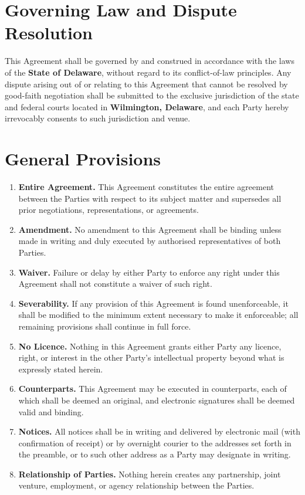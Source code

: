 \documentclass[11pt, a4paper]{article}
\begin{document}
\section{Governing Law and Dispute Resolution}

\noindent
This Agreement shall be governed by and construed in accordance with the laws
of the \textbf{State of Delaware}, without regard to its conflict-of-law
principles. Any dispute arising out of or relating to this Agreement that cannot
be resolved by good-faith negotiation shall be submitted to the exclusive
jurisdiction of the state and federal courts located in \textbf{Wilmington,
Delaware}, and each Party hereby irrevocably consents to such jurisdiction and
venue.

\section{General Provisions}

\begin{enumerate}
  \item \textbf{Entire Agreement.} This Agreement constitutes the entire
        agreement between the Parties with respect to its subject matter and
        supersedes all prior negotiations, representations, or agreements.
  \item \textbf{Amendment.} No amendment to this Agreement shall be binding
        unless made in writing and duly executed by authorised representatives
        of both Parties.
  \item \textbf{Waiver.} Failure or delay by either Party to enforce any right
        under this Agreement shall not constitute a waiver of such right.
  \item \textbf{Severability.} If any provision of this Agreement is found
        unenforceable, it shall be modified to the minimum extent necessary to
        make it enforceable; all remaining provisions shall continue in full force.
  \item \textbf{No Licence.} Nothing in this Agreement grants either Party any
        licence, right, or interest in the other Party's intellectual property
        beyond what is expressly stated herein.
  \item \textbf{Counterparts.} This Agreement may be executed in counterparts,
        each of which shall be deemed an original, and electronic signatures
        shall be deemed valid and binding.
  \item \textbf{Notices.} All notices shall be in writing and delivered by
        electronic mail (with confirmation of receipt) or by overnight courier
        to the addresses set forth in the preamble, or to such other address as
        a Party may designate in writing.
  \item \textbf{Relationship of Parties.} Nothing herein creates any partnership,
        joint venture, employment, or agency relationship between the Parties.
\end{enumerate}
\end{document}
